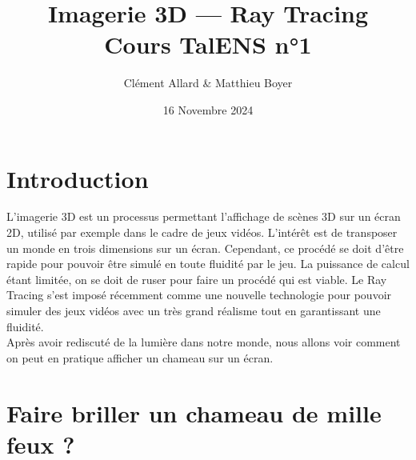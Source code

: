 \documentclass{classe}
\title{Imagerie 3D --- Ray Tracing\\ \small Cours TalENS n°1}
\author{Clément Allard \& Matthieu Boyer}
\date{16 Novembre 2024}
\begin{document}
\section*{Introduction}
L'imagerie 3D est un processus permettant l'affichage de scènes 3D sur un écran 2D, utilisé par exemple dans le cadre de jeux vidéos. L'intérêt est de transposer un monde en trois dimensions sur un écran. Cependant, ce procédé se doit d'être rapide pour pouvoir être simulé en toute fluidité par le jeu. La puissance de calcul étant limitée, on se doit de ruser pour faire un procédé qui est viable. Le Ray Tracing s'est imposé récemment comme une nouvelle technologie pour pouvoir simuler des jeux vidéos avec un très grand réalisme tout en garantissant une fluidité.
\\
Après avoir rediscuté de la lumière dans notre monde, nous allons voir comment on peut en pratique afficher un chameau sur un écran.

\section{Faire briller un chameau de mille feux ?}
\end{document}
